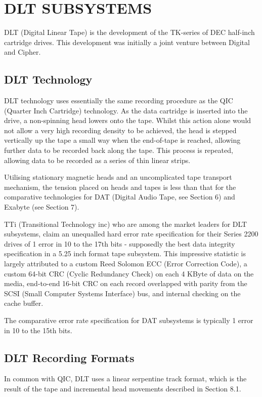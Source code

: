 \documentclass[11pt]{article}
\begin{document}
\section {DLT SUBSYSTEMS}

DLT (Digital Linear Tape) is the development of the TK-series of DEC half-inch
cartridge drives. This development was initially a joint venture between
Digital and Cipher.

\subsection {DLT Technology}

DLT technology uses essentially the same recording procedure as the QIC
(Quarter Inch Cartridge) technology. As the data cartridge is inserted into the
drive, a non-spinning head lowers onto the tape. Whilst this action alone would
not allow a very high recording density to be achieved, the head is stepped
vertically up the tape a small way when the end-of-tape is reached, allowing
further data to be recorded back along the tape. This process is repeated,
allowing data to be recorded as a series of thin linear strips.

Utilising stationary magnetic heads and an uncomplicated tape transport
mechanism, the tension placed on heads and tapes is less than that for the
comparative technologies for DAT (Digital Audio Tape, see Section 6) and
Exabyte (see Section 7).

TTi (Transitional Technology inc) who are among the market leaders for DLT
subsystems, claim an unequalled hard error rate specification for their
Series 2200 drives of 1 error in 10 to the 17th bits - supposedly the best
data integrity specification in a 5.25 inch format tape subsystem. This
impressive statistic is largely attributed to a custom Reed Solomon ECC (Error
Correction Code), a custom 64-bit CRC (Cyclic Redundancy Check) on each 4 KByte
of data on the media, end-to-end 16-bit CRC on each record overlapped with
parity from the SCSI (Small Computer Systems Interface) bus, and internal
checking on the cache buffer.

The comparative error rate specification for DAT subsystems is typically
1 error in 10 to the 15th bits.

\subsection {DLT Recording Formats}

In common with QIC, DLT uses a linear serpentine track format, which is the
result of the tape and incremental head movements described in Section 8.1.
\end{document}
